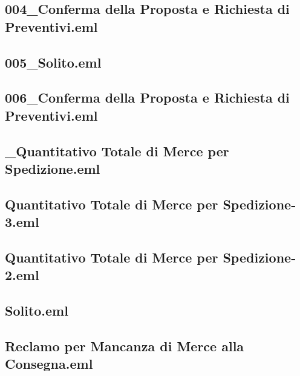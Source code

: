 \documentclass[a4paper,12pt]{report}
\begin{document}
\subsection{004\_Conferma della Proposta e Richiesta di Preventivi.eml}
\vspace{5pt}


\subsection{005\_Solito.eml}
\vspace{5pt}


\subsection{006\_Conferma della Proposta e Richiesta di Preventivi.eml}
\vspace{5pt}


\subsection{\_Quantitativo Totale di Merce per Spedizione.eml}
\vspace{5pt}


\subsection{Quantitativo Totale di Merce per Spedizione-3.eml}
\vspace{5pt}


\subsection{Quantitativo Totale di Merce per Spedizione-2.eml}
\vspace{5pt}


\subsection{Solito.eml}
\vspace{5pt}


\subsection{Reclamo per Mancanza di Merce alla Consegna.eml}
\vspace{5pt}

\end{document}
